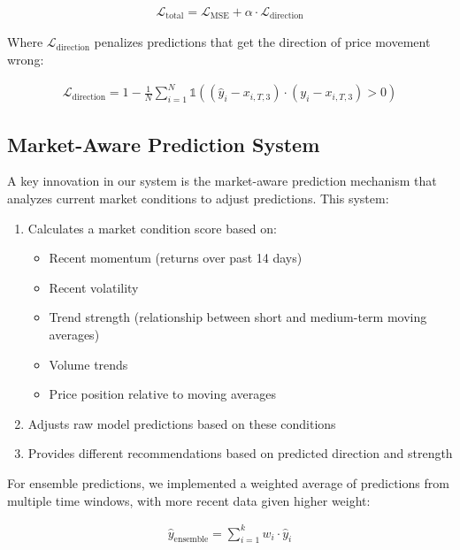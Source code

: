 \documentclass[conference]{IEEEtran}
\begin{document}
\begin{equation}
\begin{aligned}
\mathcal{L}_{\text{total}} = \mathcal{L}_{\text{MSE}} + \alpha \cdot \mathcal{L}_{\text{direction}}
\end{aligned}
\end{equation}

Where $\mathcal{L}_{\text{direction}}$ penalizes predictions that get the direction of price movement wrong:

\begin{equation}
\begin{aligned}
\mathcal{L}_{\text{direction}} = 1 - \frac{1}{N}\sum_{i=1}^{N} \mathbb{1}((\hat{y}_i - x_{i,T,3}) \cdot (y_i - x_{i,T,3}) > 0)
\end{aligned}
\end{equation}

\subsection{Market-Aware Prediction System}
A key innovation in our system is the market-aware prediction mechanism that analyzes current market conditions to adjust predictions. This system:

\begin{enumerate}
\item Calculates a market condition score based on:
   \begin{itemize}
   \item Recent momentum (returns over past 14 days)
   \item Recent volatility
   \item Trend strength (relationship between short and medium-term moving averages)
   \item Volume trends
   \item Price position relative to moving averages
   \end{itemize}
\item Adjusts raw model predictions based on these conditions
\item Provides different recommendations based on predicted direction and strength
\end{enumerate}

For ensemble predictions, we implemented a weighted average of predictions from multiple time windows, with more recent data given higher weight:

\begin{equation}
\begin{aligned}
\hat{y}_{\text{ensemble}} = \sum_{i=1}^{k} w_i \cdot \hat{y}_i
\end{aligned}
\end{equation}
\end{document}
